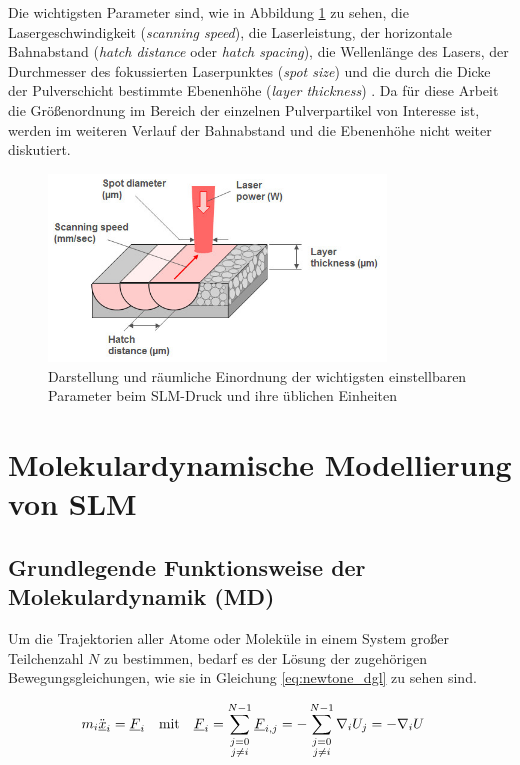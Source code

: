 		Die wichtigsten Parameter sind, wie in Abbildung \ref{fig:slm_parameters} zu sehen, die
		Lasergeschwindigkeit (\emph{scanning speed}), die Laserleistung, der horizontale
		Bahnabstand (\emph{hatch distance} oder \emph{hatch spacing}), die Wellenlänge des Lasers,
		der Durchmesser des fokussierten Laserpunktes (\emph{spot size}) und die durch die Dicke
		der Pulverschicht bestimmte Ebenenhöhe (\emph{layer thickness})
		\cite{sadali2020influence}. Da für diese Arbeit die Größenordnung im Bereich der einzelnen
		Pulverpartikel von Interesse ist, werden im weiteren Verlauf der Bahnabstand und die
		Ebenenhöhe nicht weiter diskutiert.


		\begin{figure}[ht]
			\centering
			\includegraphics[width=0.8\textwidth]{chapter/main/img/slm_parameters.jpg}
			\caption{Darstellung und räumliche Einordnung der wichtigsten einstellbaren Parameter
			beim SLM-Druck und ihre üblichen Einheiten \cite{saunders2017x}}
			\label{fig:slm_parameters}
		\end{figure}


\section{Molekulardynamische Modellierung von SLM}
	\subsection{Grundlegende Funktionsweise der Molekulardynamik (MD)}
		Um die Trajektorien aller Atome oder Moleküle in einem System großer Teilchenzahl $N$ zu
		bestimmen, bedarf es der Lösung der zugehörigen Bewegungsgleichungen, wie sie in Gleichung
		\eqref{eq:newtone_dgl} zu sehen sind.

		\begin{align}
			m_i \ddot{\underline{x}}_i &= \underline{F}_i
			& \text{mit} &&
			\underline{F}_{i} &= \sum_{\substack{j=0\\j \neq i}}^{N-1} \underline{F}_{i,j}
			= -\sum_{\substack{j=0\\j \neq i}}^{N-1} \nabla_i U_j = -\nabla_i U
			\label{eq:newtone_dgl}
		\end{align}

